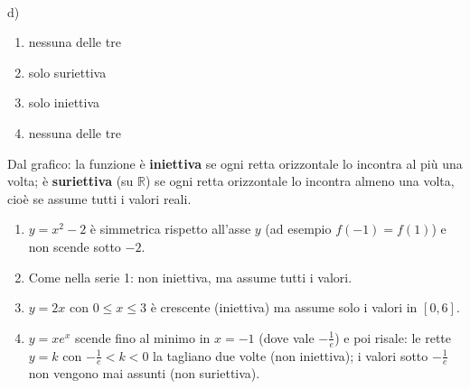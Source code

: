 \begin{question}[ID=3.2, subtitle={Classificare funzioni da grafici — serie 2}, difficulty=facile, tags={funzioni,grafici}]
\begin{center}
\begin{minipage}{0.24\textwidth}
\\ d)
\end{minipage}
\end{center}
\begin{solution}
\begin{enumerate}
    \item nessuna delle tre
    \item solo suriettiva
    \item solo iniettiva
    \item nessuna delle tre
\end{enumerate}
\end{solution}
\begin{explanation}
Dal grafico: la funzione è \textbf{iniettiva} se ogni retta orizzontale lo incontra al più una volta; è \textbf{suriettiva} (su $\mathbb{R}$) se ogni retta orizzontale lo incontra almeno una volta, cioè se assume tutti i valori reali.
\begin{enumerate}
    \item $y=x^2-2$ è simmetrica rispetto all'asse $y$ (ad esempio $f(-1)=f(1)$) e non scende sotto $-2$.
    \item Come nella serie 1: non iniettiva, ma assume tutti i valori.
    \item $y=2x$ con $0\leq x\leq3$ è crescente (iniettiva) ma assume solo i valori in $[0,6]$.
    \item $y=xe^x$ scende fino al minimo in $x=-1$ (dove vale $-\tfrac1e$) e poi risale: le rette $y=k$ con $-\tfrac1e<k<0$ la tagliano due volte (non iniettiva); i valori sotto $-\tfrac1e$ non vengono mai assunti (non suriettiva).
\end{enumerate}
\end{explanation}
\end{question}


